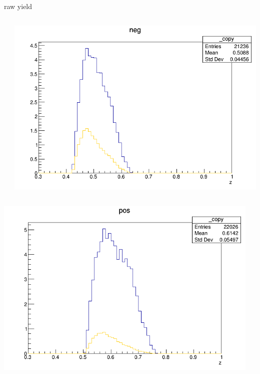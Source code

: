 \begin{frame}{raw yield}
\begin{columns}
\begin{column}[T]{0.25\textwidth}
\end{column}
\begin{column}[T]{0.25\textwidth}
\includegraphics[width = \textwidth]{results/yield/statistics/yield_x_Q2_z_0.50_5.500_0.50_neg.png}
\end{column}
\end{columns}
\begin{columns}
\begin{column}[T]{0.25\textwidth}
\includegraphics[width = \textwidth]{results/yield/statistics/yield_x_Q2_z_0.50_5.500_0.60_pos.png}
\end{column}
\begin{column}[T]{0.25\textwidth}

\end{column}
\end{columns}
\end{frame}
